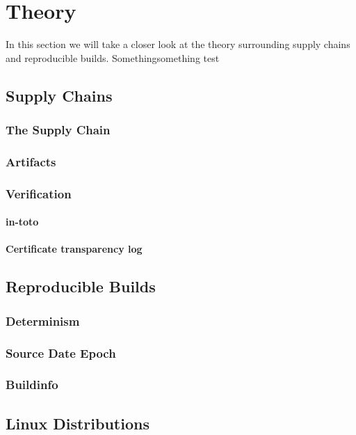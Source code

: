 \documentclass[../Main/thesis.tex]{subfiles}
\begin{document}
\chapter{Theory}
\label{ch:theory}
In this section we will take a closer look at the theory surrounding
supply chains and reproducible builds. Somethingsomething test

\section{Supply Chains}\label{sec:supply_chain}
    \subsection*{The Supply Chain}
    \subsection*{Artifacts}
    \subsection*{Verification}
    \subsubsection*{in-toto}
    \subsubsection*{Certificate transparency log}

\section{Reproducible Builds}\label{sec:reproducible_builds}
    \subsection*{Determinism}
    \subsection*{Source Date Epoch}
    \subsection*{Buildinfo}

\section{Linux Distributions}\label{sec:linux_distributions}
\end{document}
